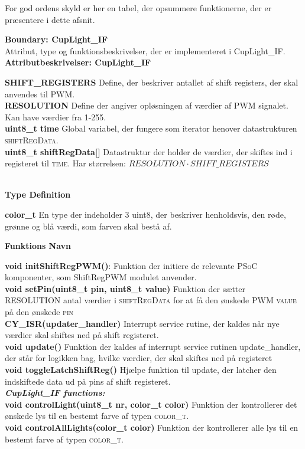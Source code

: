 \documentclass[Softwaredesign/Softwaredesign_main.tex]{subfiles}
\begin{document}
For god ordens skyld er her en tabel, der opsummere funktionerne, der er præsentere i dette afsnit.


{\large\textbf{Boundary:  CupLight\_IF}}\\
Attribut, type og funktionsbeskrivelser, der er implementeret i CupLight\_IF.\\
{\large\textbf{Attributbeskrivelser: CupLight\_IF}}
\begin{adjustwidth}{1cm}{0pt}
\textbf{SHIFT\_REGISTERS} Define, der beskriver antallet af shift registers, der skal anvendes til PWM. \\[0.2cm]
\textbf{RESOLUTION} Define der angiver opløsningen af værdier af PWM signalet. Kan have værdier fra 1-255.\\[0.2cm]
\textbf{uint8\_t time} Global variabel, der fungere som iterator henover datastrukturen \textsc{shiftRegData}.\\[0.2cm]
\textbf{uint8\_t shiftRegData{[}{]}} Datastruktur der holder de værdier, der skiftes ind i registeret til \textsc{time}. Har størrelsen: $RESOLUTION\cdot SHIFT\_REGISTERS$\\
\end{adjustwidth}\\
{\large\textbf{Type Definition}}
\begin{adjustwidth}{1cm}{0pt}
\textbf{color\_t} En type der indeholder 3 uint8, der beskriver henholdsvis, den røde, grønne og blå værdi, som farven skal bestå af.\\[0.2cm]
\end{adjustwidth}
{\large\textbf{Funktions Navn}}
\begin{adjustwidth}{1cm}{0pt}
\textbf{void initShiftRegPWM()}: Funktion der initiere de relevante PSoC komponenter, som ShiftRegPWM modulet anvender.\\[0.2cm]
\textbf{void setPin(uint8\_t pin, uint8\_t value)} Funktion der sætter \textsc{RESOLUTION} antal værdier i \textsc{shiftRegData} for at få den ønskede PWM \textsc{value} på den ønskede \textsc{pin}\\[0.2cm]
\textbf{CY\_ISR(updater\_handler)} Interrupt service rutine, der kaldes når nye værdier skal shiftes ned på shift registeret.\\[0.2cm]
\textbf{void update()} Funktion der kaldes af interrupt service rutinen update\_handler, der står for logikken bag, hvilke værdier, der skal skiftes ned på registeret\\[0.2cm]
\textbf{void toggleLatchShiftReg()} Hjælpe funktion til update, der latcher den indskiftede data ud på pins af shift registeret.\\ [0.2cm]
\textbf{\textit{CupLight\_IF functions:}}\\[0.2cm]
\textbf{void controlLight(uint8\_t nr, color\_t color)} Funktion der kontrollerer det ønskede lys til en bestemt farve af typen \textsc{color\_t}.\\ [0.2cm] 
\textbf{void controlAllLights(color\_t color)} Funktion der kontrollerer alle lys til en bestemt farve af typen \textsc{color\_t}.\\ 

\end{adjustwidth}
\end{document}
